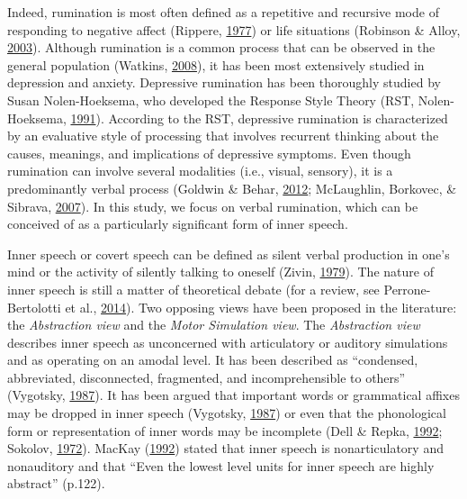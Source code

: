 \documentclass[a4paper,12pt,twoside,openright,oldfontcommands]{memoir}
\begin{document}
Indeed, rumination is most often defined as a repetitive and recursive mode of responding to negative affect (Rippere, \protect\hyperlink{ref-Rippere1977}{1977}) or life situations (Robinson \& Alloy, \protect\hyperlink{ref-Robinson2003}{2003}). Although rumination is a common process that can be observed in the general population (Watkins, \protect\hyperlink{ref-Watkins2008}{2008}), it has been most extensively studied in depression and anxiety. Depressive rumination has been thoroughly studied by Susan Nolen-Hoeksema, who developed the Response Style Theory (RST, Nolen-Hoeksema, \protect\hyperlink{ref-nolen-hoeksema_responses_1991}{1991}). According to the RST, depressive rumination is characterized by an evaluative style of processing that involves recurrent thinking about the causes, meanings, and implications of depressive symptoms. Even though rumination can involve several modalities (i.e., visual, sensory), it is a predominantly verbal process (Goldwin \& Behar, \protect\hyperlink{ref-goldwin_concreteness_2012}{2012}; McLaughlin, Borkovec, \& Sibrava, \protect\hyperlink{ref-mclaughlin_effects_2007}{2007}). In this study, we focus on verbal rumination, which can be conceived of as a particularly significant form of inner speech.

Inner speech or covert speech can be defined as silent verbal production in one's mind or the activity of silently talking to oneself (Zivin, \protect\hyperlink{ref-zivin_development_1979}{1979}). The nature of inner speech is still a matter of theoretical debate (for a review, see Perrone-Bertolotti et al., \protect\hyperlink{ref-Perrone-Bertolotti2014}{2014}). Two opposing views have been proposed in the literature: the \emph{Abstraction view} and the \emph{Motor Simulation view}. The \emph{Abstraction view} describes inner speech as unconcerned with articulatory or auditory simulations and as operating on an amodal level. It has been described as \enquote{condensed, abbreviated, disconnected, fragmented, and incomprehensible to others} (Vygotsky, \protect\hyperlink{ref-vygotsky_collected_1987}{1987}). It has been argued that important words or grammatical affixes may be dropped in inner speech (Vygotsky, \protect\hyperlink{ref-vygotsky_collected_1987}{1987}) or even that the phonological form or representation of inner words may be incomplete (Dell \& Repka, \protect\hyperlink{ref-dell_errors_1992}{1992}; Sokolov, \protect\hyperlink{ref-sokolov_inner_1972}{1972}). MacKay (\protect\hyperlink{ref-mackay_constraints_1992}{1992}) stated that inner speech is nonarticulatory and nonauditory and that \enquote{Even the lowest level units for inner speech are highly abstract} (p.122).
\end{document}

